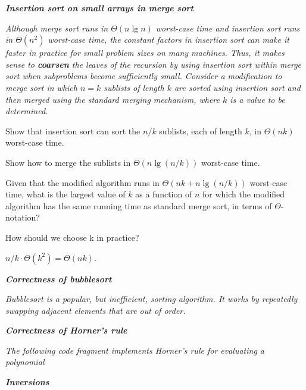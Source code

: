 \begin{description}
   {\bfseries \itshape Insertion sort on small arrays in merge sort}

    {\itshape Although merge sort runs in $\Theta(n \lg n)$ worst-case time and insertion sort runs in $\Theta(n^2)$ worst-case time, the constant factors in insertion sort can make it faster in practice for small problem sizes on many machines. Thus, it makes sense to {\bfseries coarsen} the leaves of the recursion by using insertion sort within merge sort when subproblems become sufficiently small. Consider a modification to merge sort in which $n=k$ sublists of length $k$ are sorted using insertion sort and then merged using the standard merging mechanism, where $k$ is a value to be determined.
      \begin{Al}
        \item Show that insertion sort can sort the $n/k$ sublists, each of length $k$, in $\Theta (nk)$  worst-case time.
        \item Show how to merge the sublists in $\Theta (n\lg (n/k))$ worst-case time.
        \item Given that the modified algorithm runs in $\Theta(nk + n\lg (n/k))$ worst-case time, what is the largest value of $k$ as a function of $n$ for which the modified algorithm has the same running time as standard merge sort, in terms of $\Theta$-notation?
        \item How should we choose k in practice?
      \end{Al}
    }

    \begin{pbrev}
        \begin{Al} 
            \item $n/k \cdot \Theta(k^2)  = \Theta(nk)$.
        \end{Al}
    \end{pbrev}

   {\bfseries \itshape Correctness of bubblesort}

    {\itshape Bubblesort is a popular, but inefficient, sorting algorithm. It works by repeatedly
    swapping adjacent elements that are out of order.}

    \begin{pbrev}
      
    \end{pbrev}

   {\bfseries \itshape Correctness of Horner’s rule}

    {\itshape The following code fragment implements Horner’s rule for evaluating a polynomial}

    \begin{pbrev}
      
    \end{pbrev}

   {\bfseries \itshape Inversions}

    \begin{pbrev}
      
    \end{pbrev}

\end{description}

